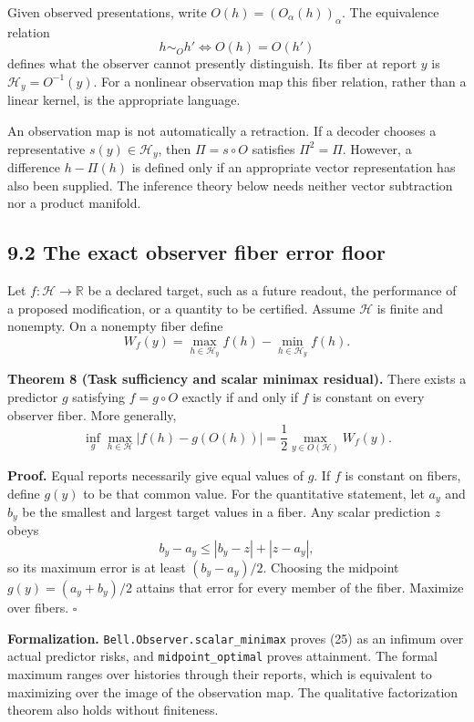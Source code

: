 \documentclass[
]{article}
\begin{document}
Given observed presentations, write \(O(h)=(O_\alpha(h))_\alpha\). The equivalence relation
\[
h\sim_O h'\iff O(h)=O(h')
\]
defines what the observer cannot presently distinguish. Its fiber at report \(y\) is \(\mathcal H_y=O^{-1}(y)\). For a nonlinear observation map this fiber relation, rather than a linear kernel, is the appropriate language.

An observation map is not automatically a retraction. If a decoder chooses a representative \(s(y)\in\mathcal H_y\), then \(\Pi=s\circ O\) satisfies \(\Pi^2=\Pi\). However, a difference \(h-\Pi(h)\) is defined only if an appropriate vector representation has also been supplied. The inference theory below needs neither vector subtraction nor a product manifold.

\subsection{9.2 The exact observer fiber error floor}\label{the-exact-observer-fiber-error-floor}

Let \(f:\mathcal H\to\mathbb R\) be a declared target, such as a future readout, the performance of a proposed modification, or a quantity to be certified. Assume \(\mathcal H\) is finite and nonempty. On a nonempty fiber define
\[
W_f(y)=\max_{h\in\mathcal H_y}f(h)-\min_{h\in\mathcal H_y}f(h).
\]

\textbf{Theorem 8 (Task sufficiency and scalar minimax residual).} There exists a predictor \(g\) satisfying \(f=g\circ O\) exactly if and only if \(f\) is constant on every observer fiber. More generally,
\[
\inf_g\max_{h\in\mathcal H}|f(h)-g(O(h))|
=\frac12\max_{y\in O(\mathcal H)}W_f(y).
\tag{25}
\]

\textbf{Proof.} Equal reports necessarily give equal values of \(g\). If \(f\) is constant on fibers, define \(g(y)\) to be that common value. For the quantitative statement, let \(a_y\) and \(b_y\) be the smallest and largest target values in a fiber. Any scalar prediction \(z\) obeys
\[
b_y-a_y\le|b_y-z|+|z-a_y|,
\]
so its maximum error is at least \((b_y-a_y)/2\). Choosing the midpoint \(g(y)=(a_y+b_y)/2\) attains that error for every member of the fiber. Maximize over fibers. \(\square\)

\textbf{Formalization.} \texttt{Bell.Observer.scalar\_minimax} proves (25) as an infimum over actual predictor risks, and \texttt{midpoint\_optimal} proves attainment. The formal maximum ranges over histories through their reports, which is equivalent to maximizing over the image of the observation map. The qualitative factorization theorem also holds without finiteness.
\end{document}
